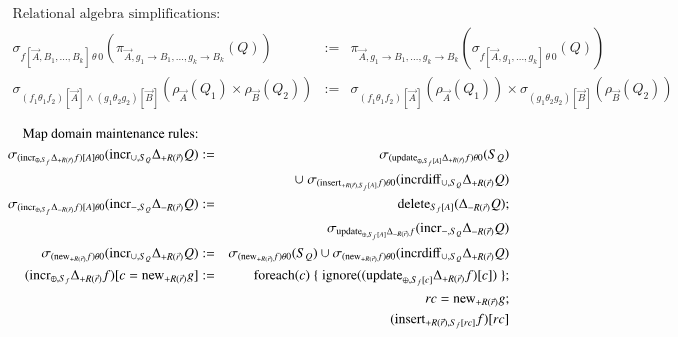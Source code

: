 \documentclass{article}
\begin{document}
\begin{figure*}
\begin{eqnarray}
\mbox{Relational algebra simplifications:} &&
\nonumber\\
\label{eq:rs1}
\sigma_{f[\vec{A}, B_1, \dots, B_k] \,\theta\, 0}
   (\pi_{\vec{A}, g_1 \rightarrow B_1, \dots, g_k \rightarrow B_k}(Q))
&:=&
\pi_{\vec{A}, g_1 \rightarrow B_1, \dots, g_k \rightarrow B_k}(
\sigma_{f[\vec{A}, g_1, \dots, g_k] \,\theta\, 0}(Q))
\\
\label{eq:rs2}
\sigma_{(f_1 \theta_1 f_2)[\vec{A}] \wedge (g_1 \theta_2 g_2)[\vec{B}]}
(\rho_{\vec{A}}(Q_1) \times \rho_{\vec{B}}(Q_2))
&:=&
\sigma_{(f_1 \theta_1 f_2)[\vec{A}]}(\rho_{\vec{A}}(Q_1)) \times
\sigma_{(g_1 \theta_2 g_2)[\vec{B}]}(\rho_{\vec{B}}(Q_2))
\end{eqnarray}
\end{figure*}

%
\begin{figure*}
\begin{eqnarray}
\mbox{Map domain maintenance rules:} && \nonumber\\
\label{eq:md1}
\sigma_{(\algincr_{\oplus, S_f} \Delta_{+R(\vec{r})} f)[A] \theta 0} (\algincr_{\cup, S_Q}
\Delta_{+R(\vec{r})} Q)
&:=&
\sigma_{(\algupdate_{\oplus, S_{f}[A]} \Delta_{+R(\vec{r})} f) \theta 0} (S_Q)
\\
\nonumber && 
\cup\; 
\sigma_{(\alginsert_{+R(\vec{r}), S_{f}[A]} f) \theta 0}
(\algincrdiff_{\cup, S_Q} \Delta_{+R(\vec{r})} Q)
\\
\label{eq:md2}
\sigma_{(\algincr_{\oplus, S_f} \Delta_{-R(\vec{r})} f)[A] \theta 0}
(\algincr_{-,S_Q} \Delta_{-R(\vec{r})}Q) &:=&
\algdelete_{S_f[A]}(\Delta_{-R(\vec{r})} Q);
\\
\nonumber &&
\sigma_{\algupdate_{\oplus, S_f[A]} \Delta_{-R(\vec{r})}f}
(\algincr_{-,S_Q} \Delta_{-R(\vec{r})} Q)
\\
\label{eq:md3}
\sigma_{(\algnew_{+R(\vec{r})} f) \theta 0} (\algincr_{\cup, S_Q}
\Delta_{+R(\vec{r})} Q)
&:=&
\sigma_{(\algnew_{+R(\vec{r})} f) \theta 0} (S_Q)
\cup
\sigma_{(\algnew_{+R(\vec{r})} f) \theta 0}
(\algincrdiff_{\cup, S_Q} \Delta_{+R(\vec{r})} Q)
\\
\label{eq:md4}
(\algincr_{\oplus, S_f} \Delta_{+R(\vec{r})} f)[c=\algnew_{+R(\vec{r})} g]
&:=&
\algfor(\mbox{$c$}) \; \{ \; \mathrm{ignore}((\algupdate_{\oplus, S_{f}[c]} \Delta_{+R(\vec{r})} f)[c]) \; \};
\\
\nonumber && rc = \algnew_{+R(\vec{r})} g;
\\
\nonumber
&&
(\alginsert_{+R(\vec{r}), S_{f}[rc]} f)[rc]
\\
\label{eq:md5}

\end{eqnarray}
\end{figure*}
\end{document}
